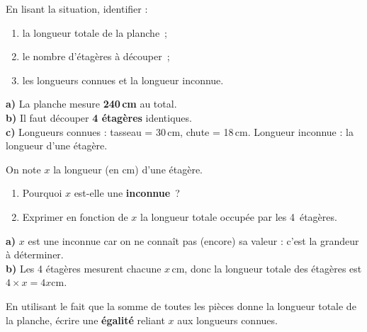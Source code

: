 \documentclass[a4paper,11pt]{article}
\begin{document}
\vspace{8pt}


\begin{question}
En lisant la situation, identifier :
\begin{enumerate}[label=\alph*)]
  \item la longueur totale de la planche~;
  \item le nombre d'étagères à découper~;
  \item les longueurs connues et la longueur inconnue.
\end{enumerate}
\end{question}

\begin{correction}
\textbf{a)} La planche mesure \textbf{240\,cm} au total.\\
\textbf{b)} Il faut découper \textbf{4 étagères} identiques.\\
\textbf{c)} Longueurs connues : tasseau = 30\,cm, chute = 18\,cm. Longueur inconnue : la longueur d'une étagère.
\end{correction}

\vspace{6pt}

\begin{question}
On note $x$ la longueur (en cm) d'une étagère.
\begin{enumerate}[label=\alph*)]
  \item Pourquoi $x$ est-elle une \textbf{inconnue}~?
  \item Exprimer en fonction de $x$ la longueur totale occupée par les 4~étagères.
\end{enumerate}
\end{question}

\begin{correction}
\textbf{a)} $x$ est une inconnue car on ne connaît pas (encore) sa valeur : c'est la grandeur à déterminer.\\
\textbf{b)} Les 4 étagères mesurent chacune $x$\,cm, donc la longueur totale des étagères est $4 \times x = 4x$\;cm.
\end{correction}

\vspace{6pt}

\begin{question}
En utilisant le fait que la somme de toutes les pièces donne la longueur totale de la planche, écrire une \textbf{égalité} reliant $x$ aux longueurs connues.
\end{question}
\end{document}
